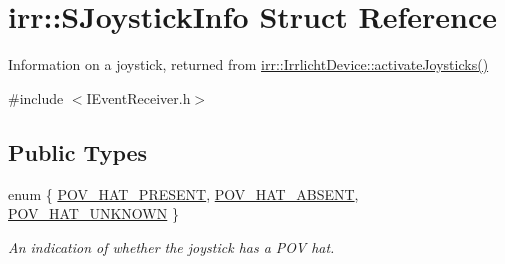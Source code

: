 \hypertarget{structirr_1_1SJoystickInfo}{}\section{irr\+:\+:S\+Joystick\+Info Struct Reference}
\label{structirr_1_1SJoystickInfo}


Information on a joystick, returned from \hyperlink{classirr_1_1IrrlichtDevice_af06f8d2c4fdffd1f879e46685bcbc6e3}{irr\+::\+Irrlicht\+Device\+::activate\+Joysticks()}  




{\ttfamily \#include $<$I\+Event\+Receiver.\+h$>$}

\subsection*{Public Types}
\begin{DoxyCompactItemize}
\item 
enum \{ \hyperlink{structirr_1_1SJoystickInfo_a5ab1b9b6969289f70b321d3c3657d999af5061a1972f04f033d581db51f43f986}{P\+O\+V\+\_\+\+H\+A\+T\+\_\+\+P\+R\+E\+S\+E\+NT}, 
\hyperlink{structirr_1_1SJoystickInfo_a5ab1b9b6969289f70b321d3c3657d999a89c1dae670b67183c5b4e675f9e58792}{P\+O\+V\+\_\+\+H\+A\+T\+\_\+\+A\+B\+S\+E\+NT}, 
\hyperlink{structirr_1_1SJoystickInfo_a5ab1b9b6969289f70b321d3c3657d999a5699138583766ab8eafac5c36340c0dc}{P\+O\+V\+\_\+\+H\+A\+T\+\_\+\+U\+N\+K\+N\+O\+WN}
 \}\begin{DoxyCompactList}\small\item\em An indication of whether the joystick has a P\+OV hat. \end{DoxyCompactList}
\end{DoxyCompactItemize}
